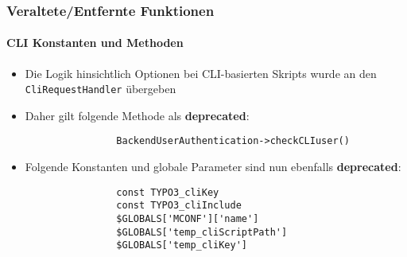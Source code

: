 \begin{frame}[fragile]
	\frametitle{Veraltete/Entfernte Funktionen}
	\framesubtitle{CLI Konstanten und Methoden}


	\begin{itemize}

		\item Die Logik hinsichtlich Optionen bei CLI-basierten Skripts wurde an den \texttt{CliRequestHandler} übergeben

		\item Daher gilt folgende Methode als \textbf{deprecated}:

			\begin{lstlisting}
				BackendUserAuthentication->checkCLIuser()
			\end{lstlisting}

		\item Folgende Konstanten und globale Parameter sind nun ebenfalls \textbf{deprecated}:

			\begin{lstlisting}
				const TYPO3_cliKey
				const TYPO3_cliInclude
				$GLOBALS['MCONF']['name']
				$GLOBALS['temp_cliScriptPath']
				$GLOBALS['temp_cliKey']
			\end{lstlisting}

	\end{itemize}

\end{frame}


